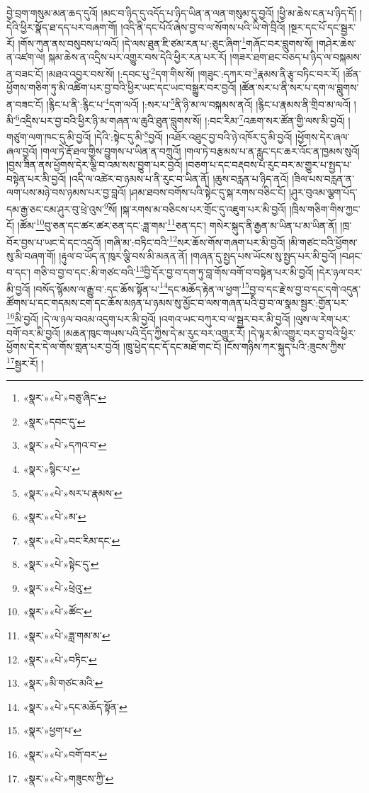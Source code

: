 བྱེ་བྲག་གསུམ་མན་ཆད་དུའོ། །མང་བ་ཉིད་དུ་འདོད་པ་ཉིད་ཡིན་ན་ལན་གསུམ་དུ་བྱའོ། །ཕྱི་མ་ཆེས་ངན་པ་ཉིད་དོ། །དེའི་ཕྱིར་སྣོད་ཐ་དད་པར་བཞག་གོ། །འདི་ནི་དང་པོའོ་ཞེས་བྱ་བ་ལ་སོགས་པའི་ཡི་གེ་བྲིའོ། །སྔར་དང་པོ་དང་སྦྱར་རོ། །གོས་ཀུན་ནས་བསུབས་པ་ལའོ། །དེ་ལས་ཐུན་ཇི་ཙམ་རན་པ་:ཅུང་ཞིག་\footnote{«སྣར་»«པེ་»བཅུ་ཞིང་}གཞོང་བར་བླུགས་སོ། །གཤེར་ཆེས་ན་འཛག་ལ། སྐམ་ཆེས་ན་འདྲིས་པར་འགྱུར་བས་དེའི་ཕྱིར་རན་པར་རོ། །གཟར་ཐག་ཐང་བཅད་པ་ཉིད་ལ་བསྐམས་ན་བཟང་ངོ། །མཐའ་འབྱར་བས་སོ། །:དབང་པུ་\footnote{«སྣར་»དབང་དུ་}དག་གིས་སོ། །གཟུང་:དཀར་བ་\footnote{«སྣར་»«པེ་»དཀའ་བ་}རྣམས་ནི་རྩྭ་བཏིང་བར་རོ། །ཚོན་ཕྱོགས་གཅིག་ཏུ་མི་འཚིག་པར་བྱ་བའི་ཕྱིར་ཡང་དང་ཡང་བསྒྱུར་བར་བྱའོ། །ཚོན་སར་པ་ནི་སར་པ་དག་ལ་བླུགས་ན་བཟང་ངོ། །རྙིང་པ་ནི་:རྙིང་པ་\footnote{«སྣར་»སྙིང་པ་}དག་ལའོ། །:སར་པ་\footnote{«སྣར་»«པེ་»སར་པ་རྣམས་}ནི་ཉི་མ་ལ་བསྐམས་ནའོ། །རྙིང་པ་རྣམས་ནི་གྲིབ་མ་ལའོ། །མི་\footnote{«སྣར་»«པེ་»མ་}འདྲིས་པར་བྱ་བའི་ཕྱིར་ཉི་མ་གཞན་ལ་ཆུའི་ཐུན་བླུགས་སོ། །:བང་རིམ་\footnote{«སྣར་»«པེ་»བང་རིམ་དང་}འཆག་སར་ཚོན་གྱི་ལས་མི་བྱའོ། །གཙུག་ལག་ཁང་དུ་མི་བྱའོ། །དེའི་:སྟེང་དུ་མི་\footnote{«སྣར་»«པེ་»སྟེང་དུ་}བྱའོ། །འཐོར་འཐུང་བྱ་བའི་ཉེ་འཁོར་དུ་མི་བྱའོ། །ཕྱོགས་དེར་ཞལ་ཞལ་བྱའོ། །གལ་ཏེ་རྡོ་ཐལ་གྱིས་བྱུགས་པ་ཡིན་ན་བཀྲུའོ། །གལ་ཏེ་བརྩམས་པ་ན་རླུང་དང་ཆར་འོང་ན་ཁྱམས་སུའོ། །བྱས་ཟིན་ནས་ཕྱོགས་དེར་ལྕི་བ་འམ་སས་བྱུག་པར་བྱའོ། །བཅག་པ་དང་བརྡབས་པ་རུང་བར་མ་གྱུར་པ་སྤྱད་པ་བསྟེན་པར་མི་བྱའོ། །འདི་ལ་འཚེར་བ་ཉམས་པ་ནི་རུང་བ་ཡིན་ནོ། །ཆུས་བརླན་པ་ཉིད་ནའོ། །ཟིལ་པས་བརླན་ན་ལག་པས་མཉེ་བས་ཉམས་པར་བྱ་བླའོ། །ཤམ་ཐབས་བགོས་པའི་སྟེང་དུ་སྐ་རགས་བཅིང་ངོ། །ཤུར་བུའམ་ལྕག་པོད་དམ་རྒྱ་ཅང་ངམ་ཤུར་བུ་ཕྲེ་འུས་\footnote{«སྣར་»«པེ་»ཕྲེའུ་}སོ། །སྐ་རགས་མ་བཅིངས་པར་གྲོང་དུ་འཇུག་པར་མི་བྱའོ། །ཁྲིས་གཅིག་གིས་ཀྱང་ངོ། །ཚོམ་\footnote{«སྣར་»«པེ་»ཚོང་}བུ་ཅན་དང་ཚར་ཚར་ཅན་དང་:ཟླ་གམ་\footnote{«སྣར་»«པེ་»ཟླ་གམ་མ་}ཅན་དང་། གསེར་སྐུད་ནི་རྒྱན་མ་ཡིན་པ་མ་ཡིན་ནོ། །ཁྲ་བོར་བྱས་པ་ཡང་དེ་དང་འདྲའོ། །གཞི་མ་:བཏིང་བའི་\footnote{«སྣར་»«པེ་»བཏིང་}སར་ཆོས་གོས་གཞག་པར་མི་བྱའོ། །མི་གཙང་བའི་ཕྱོགས་སུ་མི་བཞག་གོ། །རྟུལ་བ་ཡོད་ན་ཁུར་ལྕི་བས་མི་མནན་ནོ། །གཞན་དུ་སྤྱད་པས་ཡོངས་སུ་སྤྱད་པར་མི་བྱའོ། །བཤང་བ་དང་། གཅི་བ་བྱ་བ་དང་:མི་གཙང་བའི་\footnote{«སྣར་»མི་གཙང་མའི་}བྱི་དོར་བྱ་བ་དག་ཏུ་བླ་གོས་བགོ་བ་བསྟེན་པར་མི་བྱའོ། །དེར་ཉལ་བར་མི་བྱའོ། །བསོད་སྙོམས་ལ་རྒྱུ་བ་:དང་ཆོས་སྟོན་པ་\footnote{«སྣར་»«པེ་»དང་མཆོད་སྟོན་}དང་མཆོད་རྟེན་ལ་ཕྱག་\footnote{«སྣར་»ཕྱག་པ་}བྱ་བ་དང་རྗེ་ས་བྱ་བ་དང་དགེ་འདུན་ཚོགས་པ་དང་གདམས་ངག་དང་ཆོས་མཉན་པ་ཉམས་སུ་མྱོང་བ་ལས་གཞན་པའི་བྱ་བ་ལ་སྣམ་སྦྱར་:གྱོན་པར་\footnote{«སྣར་»«པེ་»བགོ་བར་}མི་བྱའོ། །དེ་ལ་ཉལ་བའམ་འདུག་པར་མི་བྱའོ། །འགའ་ཡང་བཀུར་བ་ལ་སྦྱར་བར་མི་བྱའོ། །ལུས་ལ་རེག་པར་བགོ་བར་མི་བྱའོ། །མཆན་ཁུང་གཡས་པའི་དྲོད་ཀྱིས་དེ་མ་རུང་བར་འགྱུར་རོ། །དེ་ལྟར་མི་འགྱུར་བར་བྱ་བའི་ཕྱིར་ཕྱོགས་དེར་དེ་ལ་གོས་གླན་པར་བྱའོ། །ཁྲུ་ཕྱེད་དང་དོ་དང་མཐོ་གང་ངོ། །ངོས་གཉིས་ཀར་སྐུད་པའི་:ཟུངས་ཀྱིས་\footnote{«སྣར་»«པེ་»གཟུངས་ཀྱི་}སྦྱར་རོ། །
